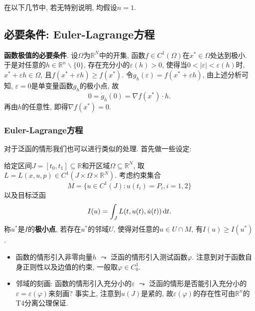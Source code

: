 \documentclass[12pt,a4paper]{article}
\begin{document}
在以下几节中, 若无特别说明, 均假设$n = 1$.

\subsection{必要条件: Euler-Lagrange方程}

\textbf{函数极值的必要条件}. 设$\Omega$为$\mathbb{R}^N$中的开集, 函数$f \in C^1(\Omega)$在$x^* \in \Omega$处达到极小.
于是对任意的$h \in \mathbb{R}^n \smallsetminus \{0\}$, 存在充分小的$\varepsilon(h) > 0$, 使得当$0 < |\varepsilon| < \varepsilon(h)$时, $x^* + \varepsilon h \in \Omega$, 且$f(x^* + \varepsilon h) \geq f(x^*)$.
令$g_h(\varepsilon) = f(x^* + \varepsilon h)$, 由上述分析可知, $\varepsilon = 0$是单变量函数$g_h$的极小点, 故
\begin{equation*}
    0 = \dot g_h(0) = \nabla f(x^*) \cdot h.
\end{equation*}
再由$h$的任意性, 即得$\nabla f(x^*) = 0$.

\subsubsection{Euler-Lagrange方程}

对于泛函的情形我们也可以进行类似的处理. 首先做一些设定:

给定区间$J = [t_0, t_1] \subseteq \mathbb{R}$和开区域$\Omega \subseteq \mathbb{R}^N$, 取$L = L(x, u, p) \in C^1(J \times \Omega \times \mathbb{R}^N)$.
考虑约束集合 
\begin{equation*}
    M = \{u \in C^1(J)\colon u(t_i) = P_i, i = 1, 2\}
\end{equation*}
以及目标泛函 
\begin{equation*}
    I(u) =\int_JL(t, u(t), \dot{u}(t)) \,{\rm d}t.
\end{equation*}
称$u^*$是$I$的\textbf{极小点}, 若存在$u^*$的邻域$U$, 使得对任意的$u \in U \cap M$, 有$I(u) \geq I(u^*)$.
\begin{itemize}
    \item 函数的情形引入非零向量$h$ $\leadsto$ 泛函的情形引入测试函数$\varphi$.
    注意到对于函数自身正则性以及边值的约束, 一般取$\varphi \in C_0^1$.
    \item 邻域的刻画: 函数的情形引入充分小的$\varepsilon$ $\leadsto$ 泛函的情形是否能引入充分小的$\varepsilon = \varepsilon(\varphi)$来刻画?
    事实上, 注意到$u(J)$是紧的, 故$\varepsilon(\varphi)$的存在性可由$\mathbb{R}^n$的T4分离公理保证.
\end{itemize}
\end{document}
